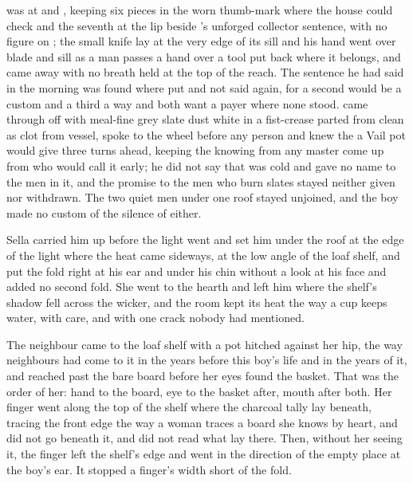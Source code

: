 was at  and , keeping six pieces in the worn thumb-mark where the house could check and the seventh at the lip beside 's unforged collector sentence, with no figure on ; the small knife lay at the very edge of its sill and his hand went over blade and sill as a man passes a hand over a tool put back where it belongs, and came away with no breath held at the top of the reach. The sentence he had said in the morning was found where put and not said again, for a second would be a custom and a third a way and both want a payer where none stood.  came through  off  with meal-fine grey slate dust white in a fist-crease parted from clean as clot from vessel, spoke to the wheel before any person and knew the  a Vail pot would give three turns ahead, keeping the knowing from any master come up from  who would call it early; he did not say that  was cold and gave no name to the men in it, and the promise to the men who burn slates stayed neither given nor withdrawn. The two quiet men under one roof stayed unjoined, and the boy made no custom of the silence of either.

\scenebreak

Sella carried him up before the light went and set him under the roof at the edge of the light where the heat came sideways, at the low angle of the loaf shelf, and put the fold right at his ear and under his chin without a look at his face and added no second fold. She went to the hearth and left him where the shelf's shadow fell across the wicker, and the room kept its heat the way a cup keeps water, with care, and with one crack nobody had mentioned.

The neighbour came to the loaf shelf with a pot hitched against her hip, the way neighbours had come to it in the years before this boy's life and in the years of it, and reached past the bare board before her eyes found the basket. That was the order of her: hand to the board, eye to the basket after, mouth after both. Her finger went along the top of the shelf where the charcoal tally lay beneath, tracing the front edge the way a woman traces a board she knows by heart, and did not go beneath it, and did not read what lay there. Then, without her seeing it, the finger left the shelf's edge and went in the direction of the empty place at the boy's ear. It stopped a finger's width short of the fold.

